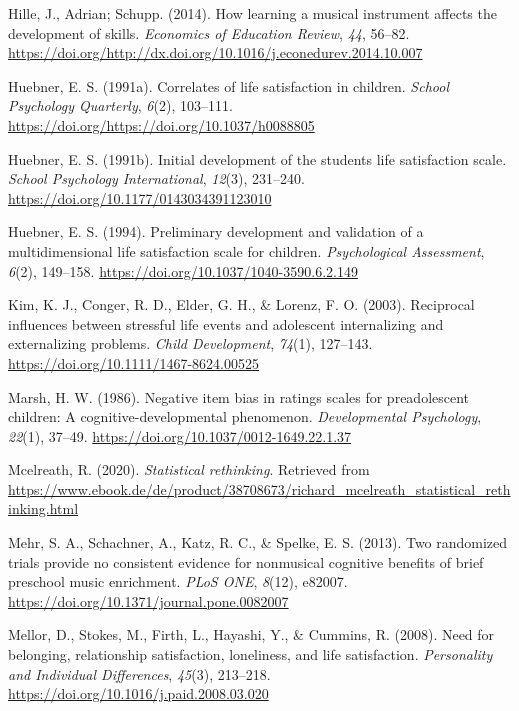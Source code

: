 \documentclass[a4, 12pt]{article}
\begin{document}
\leavevmode\hypertarget{ref-Hille2014}{}%
Hille, J., Adrian; Schupp. (2014). How learning a musical instrument affects the development of skills. \emph{Economics of Education Review}, \emph{44}, 56--82. \url{https://doi.org/http://dx.doi.org/10.1016/j.econedurev.2014.10.007}

\leavevmode\hypertarget{ref-Huebner1991}{}%
Huebner, E. S. (1991a). Correlates of life satisfaction in children. \emph{School Psychology Quarterly}, \emph{6}(2), 103--111. \url{https://doi.org/https://doi.org/10.1037/h0088805}

\leavevmode\hypertarget{ref-Huebner1991a}{}%
Huebner, E. S. (1991b). Initial development of the students life satisfaction scale. \emph{School Psychology International}, \emph{12}(3), 231--240. \url{https://doi.org/10.1177/0143034391123010}

\leavevmode\hypertarget{ref-Huebner1994}{}%
Huebner, E. S. (1994). Preliminary development and validation of a multidimensional life satisfaction scale for children. \emph{Psychological Assessment}, \emph{6}(2), 149--158. \url{https://doi.org/10.1037/1040-3590.6.2.149}

\leavevmode\hypertarget{ref-Kim2003}{}%
Kim, K. J., Conger, R. D., Elder, G. H., \& Lorenz, F. O. (2003). Reciprocal influences between stressful life events and adolescent internalizing and externalizing problems. \emph{Child Development}, \emph{74}(1), 127--143. \url{https://doi.org/10.1111/1467-8624.00525}

\leavevmode\hypertarget{ref-Marsh1986}{}%
Marsh, H. W. (1986). Negative item bias in ratings scales for preadolescent children: A cognitive-developmental phenomenon. \emph{Developmental Psychology}, \emph{22}(1), 37--49. \url{https://doi.org/10.1037/0012-1649.22.1.37}

\leavevmode\hypertarget{ref-Mcelreath2020}{}%
Mcelreath, R. (2020). \emph{Statistical rethinking}. Retrieved from \url{https://www.ebook.de/de/product/38708673/richard_mcelreath_statistical_rethinking.html}

\leavevmode\hypertarget{ref-Mehr2013}{}%
Mehr, S. A., Schachner, A., Katz, R. C., \& Spelke, E. S. (2013). Two randomized trials provide no consistent evidence for nonmusical cognitive benefits of brief preschool music enrichment. \emph{PLoS ONE}, \emph{8}(12), e82007. \url{https://doi.org/10.1371/journal.pone.0082007}

\leavevmode\hypertarget{ref-Mellor2008}{}%
Mellor, D., Stokes, M., Firth, L., Hayashi, Y., \& Cummins, R. (2008). Need for belonging, relationship satisfaction, loneliness, and life satisfaction. \emph{Personality and Individual Differences}, \emph{45}(3), 213--218. \url{https://doi.org/10.1016/j.paid.2008.03.020}
\end{document}
